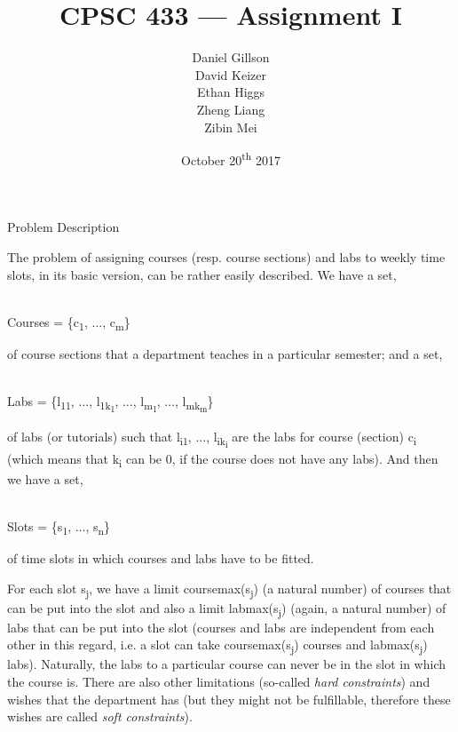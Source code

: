 \documentclass[10pt, oneside]{article}   	%
\title{\vspace{40mm}CPSC 433 --- Assignment I}
\author{
	Daniel Gillson\\
	David Keizer\\
	Ethan Higgs\\
	Zheng Liang\\
	Zibin Mei}
\date{October 20\textsuperscript{th} 2017}
\begin{document}
\maketitle
\break

\centerline{{\Large Problem Description}}
\par The problem of assigning courses (resp. course sections) and labs to weekly time slots, in its basic version, can be rather easily described. We have a set,\\\\
\centerline{Courses = \{c\textsubscript{1}, $\ldots$, c\textsubscript{m}\}}
\par\noindent of course sections that a department teaches in a particular semester; and a set,\\\\
\centerline{Labs = \{l\textsubscript{11}, $\ldots$, l\textsubscript{1k\textsubscript{1}}, $\ldots$, l\textsubscript{m\textsubscript{1}}, $\ldots$, l\textsubscript{mk\textsubscript{m}}\}}
\par\noindent of labs (or tutorials) such that l\textsubscript{i1}, $\ldots$, l\textsubscript{ik\textsubscript{i}} are the labs for course (section) c\textsubscript{i} (which means that k\textsubscript{i} can be 0, if the course does not have any labs). And then we have a set,\\\\
\centerline{Slots = \{s\textsubscript{1}, $\ldots$, s\textsubscript{n}\}}
\par\noindent of time slots in which courses and labs have to be fitted.
\par For each slot s\textsubscript{j}, we have a limit coursemax(s\textsubscript{j}) (a natural number) of courses that can be put into the slot and also a limit labmax(s\textsubscript{j}) (again, a natural number) of labs that can be put into the slot (courses and labs are independent from each other in this regard, i.e. a slot can take coursemax(s\textsubscript{j}) courses and labmax(s\textsubscript{j}) labs). Naturally, the labs to a particular course can never be in the slot in which the course is. There are also other limitations (so-called \textit{hard constraints}) and wishes that the department has (but they might not be fulfillable, therefore these wishes are called \textit{soft constraints}).
\end{document}

